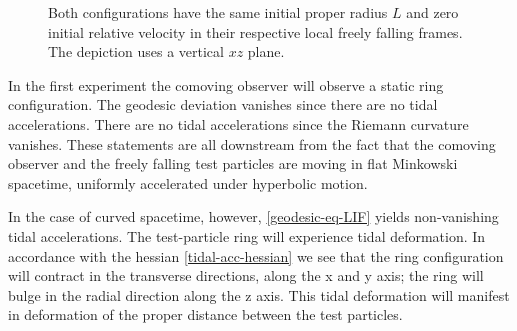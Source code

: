 \documentclass[11pt]{article}
\begin{document}
\begin{figure}[h!]
\centering
{}
\caption{Both configurations have the same initial proper radius $L$ and zero initial relative velocity in their respective local freely falling frames. The depiction uses a vertical $xz$ plane.}
\end{figure}

In the first experiment the comoving observer will observe a static ring configuration. The geodesic deviation vanishes since there are no tidal accelerations. There are no tidal accelerations since the Riemann curvature vanishes. These statements are all downstream from the fact that the comoving observer and the freely falling test particles are moving in flat Minkowski spacetime, uniformly accelerated under hyperbolic motion. \

In the case of curved spacetime, however, \eqref{geodesic-eq-LIF} yields non-vanishing tidal accelerations. The test-particle ring will experience tidal deformation. In accordance with the hessian \eqref{tidal-acc-hessian} we see that the ring configuration will contract in the transverse directions, along the x and y axis; the ring will bulge in the radial direction along the z axis. This tidal deformation will manifest in deformation of the proper distance between the test particles. 
\end{document}
